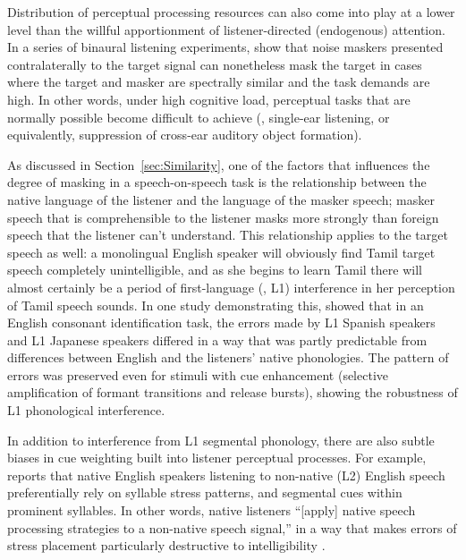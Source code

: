 Distribution of perceptual processing resources can also come into play at a lower level than the willful apportionment of listener-directed (endogenous) attention.  In a series of binaural listening experiments, \citet{GallunEtAl2007} show that noise maskers presented contralaterally to the target signal can nonetheless mask the target in cases where the target and masker are spectrally similar and the task demands are high.  In other words, under high cognitive load, perceptual tasks that are normally possible become difficult to achieve (\eg, single-ear listening, or equivalently, suppression of cross-ear auditory object formation).  %


As discussed in Section~\ref{sec:Similarity}, one of the factors that influences the degree of masking in a speech-on-speech task is the relationship between the native language of the listener and the language of the masker speech; masker speech that is comprehensible to the listener masks more strongly than foreign speech that the listener can’t understand.  This relationship applies to the target speech as well: a monolingual English speaker will obviously find Tamil target speech completely unintelligible, and as she begins to learn Tamil there will almost certainly be a period of first-language (\aka, L1) interference in her perception of Tamil speech sounds.  In one study demonstrating this, \citet{HazanSimpson2000} showed that in an English consonant identification task, the errors made by L1 Spanish speakers and L1 Japanese speakers differed in a way that was partly predictable from differences between English and the listeners’ native phonologies.  The pattern of errors was preserved even for stimuli with cue enhancement (selective amplification of formant transitions and release bursts), showing the robustness of L1 phonological interference.

In addition to interference from L1 segmental phonology, there are also subtle biases in cue weighting built into listener perceptual processes.  For example, \citeauthor{Zielinski2008} reports that native English speakers listening to non-native (L2) English speech preferentially rely on syllable stress patterns, and segmental cues within prominent syllables.  In other words, native listeners “[apply] native speech processing strategies to a non-native speech signal,” in a way that makes errors of stress placement particularly destructive to intelligibility \citep[80]{Zielinski2008}.

